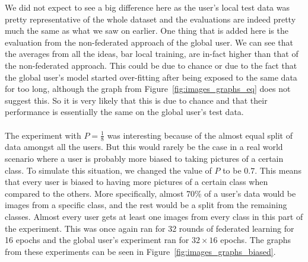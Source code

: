 \documentclass[12pt]{article}
\begin{document}
\noindent We did not expect to see a big difference here as the user's local test data was pretty representative of the whole dataset and the evaluations are indeed pretty much the same as what we saw on earlier. One thing that is added here is the evaluation from the non-federated approach of the global user. We can see that the averages from all the ideas, bar local training, are in-fact higher than that of the non-federated approach. This could be due to chance or due to the fact that the global user's model started over-fitting after being exposed to the same data for too long, although the graph from Figure~\ref{fig:images_graphs_eq} does not suggest this. So it is very likely that this is due to chance and that their performance is essentially the same on the global user's test data.
\\\\
The experiment with $P=\frac{1}{8}$ was interesting because of the almost equal split of data amongst all the users. But this would rarely be the case in a real world scenario where a user is probably more biased to taking pictures of a certain class. To simulate this situation, we changed the value of $P$ to be $0.7$. This means that every user is biased to having more pictures of a certain class when compared to the others. More specifically, almost 70\% of a user's data would be images from a specific class, and the rest would be a split from the remaining classes. Almost every user gets at least one images from every class in this part of the experiment. This was once again ran for 32 rounds of federated learning for 16 epochs and the global user's experiment ran for $32 \times 16$ epochs. The graphs from these experiments can be seen in Figure~\ref{fig:images_graphs_biased}.
\end{document}
